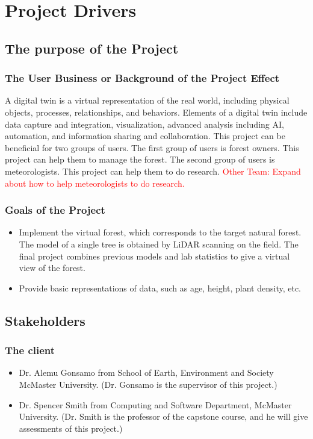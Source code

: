 \documentclass{article}
\begin{document}
\tableofcontents
\listoftables
\listoffigures
\cleardoublepage

\section{Project Drivers}
\subsection{The purpose of the Project}
\subsubsection{The User Business or Background of the Project Effect}
A digital twin is a virtual representation of the real world, including physical objects, 
processes, relationships, and behaviors. Elements of a digital twin include data capture
and integration, visualization, advanced analysis including AI, automation, and information
sharing and collaboration. This project can be beneficial for two groups of users.  The first
group of users is forest owners. This project can help them to manage the forest. The 
second group of users is meteorologists. This project can help them to 
do research. \textcolor{red}{Other Team: Expand about how to help meteorologists to do research.}
\subsubsection{Goals of the Project}
\begin{itemize}
    \item Implement the virtual forest, which corresponds to the target natural forest. The model of a single tree is obtained by LiDAR scanning on the field. The final project combines previous models and lab statistics to give a virtual view of the forest. 
    \item Provide basic representations of data, such as age, height, plant density, 
    etc. 
\end{itemize}

\subsection{Stakeholders}
\subsubsection{The client}
\begin{itemize}
    \item Dr. Alemu Gonsamo from School of Earth, Environment and Society McMaster University. (Dr. Gonsamo is the supervisor of this project.)
    \item Dr. Spencer Smith from Computing and Software Department, McMaster University. (Dr. 
    Smith is the professor of the capstone course, and he will give assessments of this project.)
\end{itemize}
\end{document}
